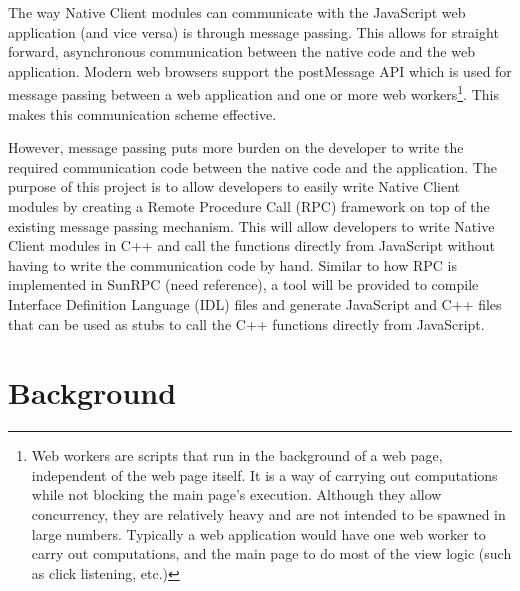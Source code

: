 The way Native Client modules can communicate with the JavaScript web application (and vice versa) is through message passing. This allows for straight forward, asynchronous communication between the native code and the web application. Modern web browsers support the postMessage API which is used for message passing between a web application and one or more web workers\footnote{Web workers\cite{webworkersw3c} are scripts that run in the background of a web page, independent of the web page itself. It is a way of carrying out computations while not blocking the main page's execution. Although they allow concurrency, they are relatively heavy and are not intended to be spawned in large numbers. Typically a web application would have one web worker to carry out computations, and the main page to do most of the view logic (such as click listening, etc.)}. This makes this communication scheme effective.

However, message passing puts more burden on the developer to write the required communication code between the native code and the application. The purpose of this project is to allow developers to easily write Native Client modules by creating a Remote Procedure Call (RPC) framework on top of the existing message passing mechanism. This will allow developers to write Native Client modules in C++ and call the functions directly from JavaScript without having to write the communication code by hand. Similar to how RPC is implemented in SunRPC (need reference), a tool will be provided to compile Interface Definition Language (IDL) files and generate JavaScript and C++ files that can be used as stubs to call the C++ functions directly from JavaScript.





\section{Background}
